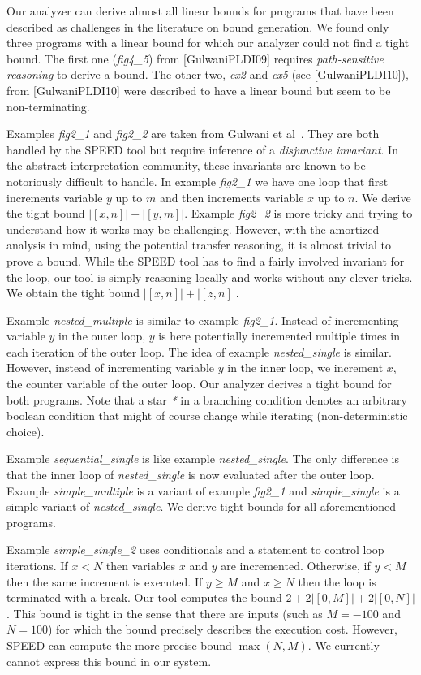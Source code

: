\documentclass[nocopyrightspace,preprint]{sigplanconf}
\begin{document}
Our analyzer can derive almost all linear bounds for programs that
have been described as challenges in the literature on bound
generation.  We found only three programs with a linear bound for
which our analyzer could not find a tight bound.  The first one
(\emph{fig4\_5}) from [GulwaniPLDI09] requires \emph{path-sensitive
  reasoning} to derive a bound.  The other two, \emph{ex2} and
\emph{ex5} (see [GulwaniPLDI10]), from [GulwaniPLDI10] were described
to have a linear bound but seem to be non-terminating.

Examples \emph{fig2\_1} and \emph{fig2\_2} are taken from Gulwani et
al~\cite{GulwaniMC09}.  They are both handled by the SPEED tool but
require inference of a \emph{disjunctive invariant}.  In the abstract
interpretation community, these invariants are known to be notoriously
difficult to handle.
%
In example \emph{fig2\_1} we have one loop that first increments
variable $y$ up to $m$ and then increments variable $x$ up to $n$.  We
derive the tight bound $|[x, n]| + |[y, m]|$.
%
Example \emph{fig2\_2} is more tricky and trying to understand how it
works may be challenging.  However, with the amortized analysis in
mind, using the potential transfer reasoning, it is almost trivial to
prove a bound.  While the SPEED tool has to find a fairly
involved invariant for the loop, our tool is simply reasoning locally
and works without any clever tricks. We obtain the tight bound $|[x,
n]| + |[z, n]|$.

Example \emph{nested\_multiple} is similar to example \emph{fig2\_1}.
Instead of incrementing variable $y$ in the outer loop, $y$ is here
potentially incremented multiple times in each iteration of the outer
loop.  The idea of example \emph{nested\_single} is similar.  However,
instead of incrementing variable $y$ in the inner loop, we increment
$x$, the counter variable of the outer loop. Our analyzer derives a
tight bound for both programs.  Note that a star \emph{*} in a
branching condition denotes an arbitrary boolean condition that might
of course change while iterating (non-deterministic choice).

Example \emph{sequential\_single} is like example
\emph{nested\_single}.  The only difference is that the inner loop of
\emph{nested\_single} is now evaluated after the outer loop.  Example
\emph{simple\_multiple} is a variant of example \emph{fig2\_1} and
\emph{simple\_single} is a simple variant of \emph{nested\_single}.
We derive tight bounds for all aforementioned programs.

Example \emph{simple\_single\_2} uses conditionals and a 
statement to control loop iterations.  If $x<N$ then variables $x$ and
$y$ are incremented.  Otherwise, if $y<M$ then the same increment is
executed.  If $y\geq M$ and $x\geq N$ then the loop is terminated with
a break.  Our tool computes the bound $2 + 2 |[0, M]| + 2 |[0, N]|$.
This bound is tight in the sense that there are inputs (such as $M =
-100$ and $N = 100$) for which the bound precisely describes the
execution cost.  However, SPEED can compute the more precise bound
$\max(N,M)$.  We currently cannot express this bound in our system.
\end{document}
